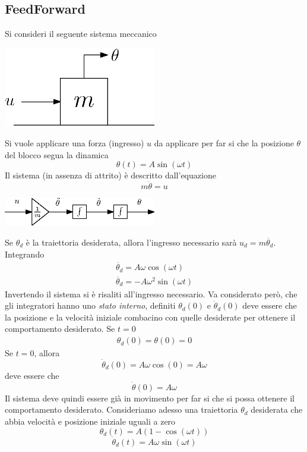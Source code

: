 \documentclass[10pt, letterpaper]{report}
\begin{document}
\subsection{FeedForward}\label{feedForward}
Si consideri il seguente sistema meccanico
\begin{center}
    \includegraphics[width=0.5\textwidth ]{images/feedForwardExample.eps}
\end{center}
Si vuole applicare una  forza (ingresso) $u$ da applicare per far si 
che la posizione $\theta$ del blocco segua la dinamica $$\theta(t)=A\sin(\omega t) $$
Il sistema (in assenza di attrito) è descritto dall'equazione $$ m\ddot{\theta}=u$$\begin{center}
    \includegraphics[width=0.5\textwidth ]{images/simulinkDiagram.eps}
\end{center}
Se $\theta_d$ è la traiettoria desiderata, allora l'ingresso necessario sarà $u_d=m\ddot{\theta_d}$. Integrando 
\begin{eqnarray}
    \dot{\theta_d} = A\omega\cos(\omega t)\\ 
    \ddot{\theta_d}=-A\omega^2\sin(\omega t)
\end{eqnarray}
Invertendo il sistema si è risaliti all'ingresso necessario. Va considerato però, che gli integratori hanno uno \textit{stato interno}, definiti $\theta_d(0)$ e $\dot\theta_d(0)$ deve essere che la posizione e la velocità iniziale combacino con quelle desiderate per ottenere il comportamento desiderato. Se $t=0$
$$ \begin{matrix}
    \theta_d(0)=\theta(0)=0
\end{matrix}$$
Se $t=0$, allora 
$$ \dot\theta_d(0)=A\omega\cos(0)=A\omega$$
deve essere che 
$$ \dot\theta(0)=A\omega$$
Il sistema deve quindi essere già in movimento per far si che si possa ottenere il comportamento desiderato.\acc 
Consideriamo adesso una traiettoria $\theta_d$ desiderata che abbia velocità e posizione iniziale uguali a zero 
$$\theta_d(t)=A(1-\cos(\omega t)) $$
$$\dot\theta_d(t)=A\omega\sin(\omega t) $$
\end{document}
